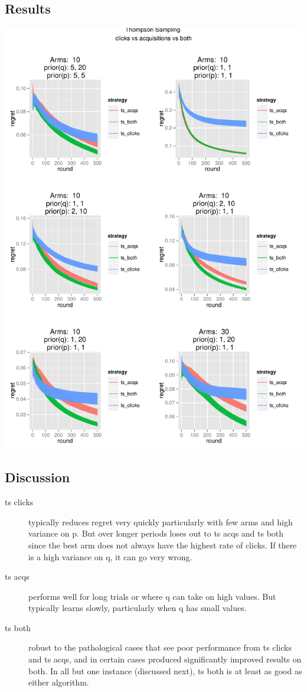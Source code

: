 \documentclass[12pt]{article}
\begin{document}
\subsection{Results}

\includegraphics[scale=0.7]{P1to6.pdf}

\subsection{Discussion}

\begin{description}
	\item[ts clicks] typically reduces regret very quickly particularly with few arms and high variance on p. But over longer periods loses out to ts acqs and ts both since the best arm does not always have the highest rate of clicks. If there is a high variance on q, it can go very wrong.
	\item[ts acqs] performs well for long trials or where q can take on high values. But typically learns slowly, particularly when q has small values.
	\item[ts both] robust to the pathological cases that see poor performance from ts clicks and ts acqs, and in certain cases produced significantly improved results on both. In all but one instance (discussed next), ts both is at least as good as either algorithm.

\end{description}
\end{document}
